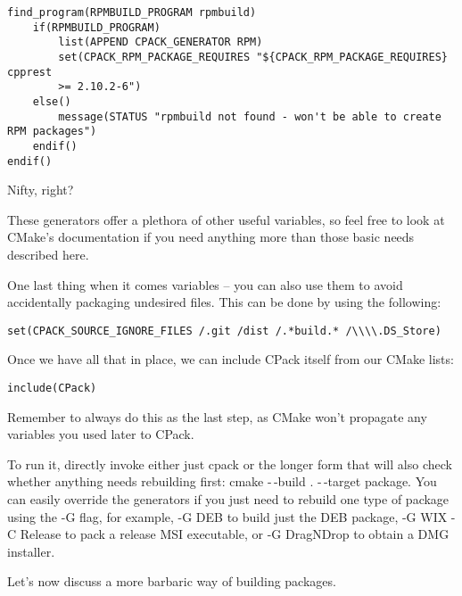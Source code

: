 \begin{lstlisting}[style=styleCMake]
	find_program(RPMBUILD_PROGRAM rpmbuild)
	if(RPMBUILD_PROGRAM)
		list(APPEND CPACK_GENERATOR RPM)
		set(CPACK_RPM_PACKAGE_REQUIRES "${CPACK_RPM_PACKAGE_REQUIRES} cpprest
		>= 2.10.2-6")
	else()
		message(STATUS "rpmbuild not found - won't be able to create RPM packages")
	endif()
endif()
\end{lstlisting}

Nifty, right?

These generators offer a plethora of other useful variables, so feel free to look at CMake's documentation if you need anything more than those basic needs described here.

One last thing when it comes variables – you can also use them to avoid accidentally packaging undesired files. This can be done by using the following:

\begin{lstlisting}[style=styleCMake]
set(CPACK_SOURCE_IGNORE_FILES /.git /dist /.*build.* /\\\\.DS_Store)
\end{lstlisting}

Once we have all that in place, we can include CPack itself from our CMake lists:

\begin{lstlisting}[style=styleCMake]
include(CPack)
\end{lstlisting}

Remember to always do this as the last step, as CMake won't propagate any variables you used later to CPack. 

To run it, directly invoke either just cpack or the longer form that will also check whether anything needs rebuilding first: cmake -\,-build . -\,-target package. You can easily override the generators if you just need to rebuild one type of package using the -G flag, for example, -G DEB to build just the DEB package, -G WIX -C Release to pack a release MSI executable, or -G DragNDrop to obtain a DMG installer.

Let's now discuss a more barbaric way of building packages.

